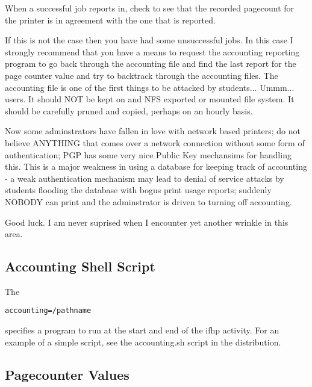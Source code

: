 \documentclass[a4paper]{article}
\begin{document}
When a successful job reports in,  check to see that the recorded pagecount
for the printer is in agreement with the one that is reported.

If this is not the case then you have had some unsuccessful jobs.
In this case I strongly recommend that you have a means to request the
accounting reporting program to go back through the accounting file and
find the last report for the page counter value and try to backtrack
through the accounting files.  The accounting file is one of the first
things to be attacked by students... Ummm...  users.  It should NOT be
kept on and NFS exported or mounted file system.  It should be
carefully pruned and copied, perhaps on an hourly basis.

Now some adminstrators have fallen in love with network based printers;
do not believe ANYTHING that comes over a network connection without
some form of authentication;  PGP has some very nice Public Key
mechansims for handling this.  This is a major weakness in using a
database for keeping track of accounting - a weak authentication
mechanism may lead to denial of service attacks by students flooding
the database with bogus print usage reports;  suddenly NOBODY can print
and the adminstrator is driven to turning off accounting.

Good luck.  I am never suprised when I encounter yet another wrinkle in
this area.


\subsection{Accounting Shell Script}

The 
\begin{tscreen}
\begin{verbatim}
accounting=/pathname
\end{verbatim}
\end{tscreen}

specifies a program to run
at the start and end of the
{\ttfamily ifhp} activity.
For an example of a simple script,
see the accounting.sh script in the distribution.


\subsection{Pagecounter Values}
\end{document}
